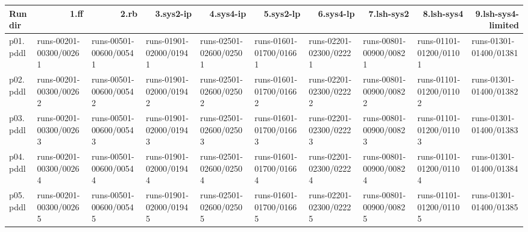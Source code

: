 \documentclass{article}
\begin{document}
\begin{tabular}{@{}lrrrrrrrrr@{}}
Run dir & 1.ff & 2.rb & 3.sys2-ip & 4.sys4-ip & 5.sys2-lp & 6.sys4-lp & 7.lsh-sys2 & 8.lsh-sys4 & 9.lsh-sys4-limited \\
\midrule
p01.pddl & \multicolumn{1}{|l|}{runs-00201-00300/00261} & \multicolumn{1}{|l|}{runs-00501-00600/00541} & \multicolumn{1}{|l|}{runs-01901-02000/01941} & \multicolumn{1}{|l|}{runs-02501-02600/02501} & \multicolumn{1}{|l|}{runs-01601-01700/01661} & \multicolumn{1}{|l|}{runs-02201-02300/02221} & \multicolumn{1}{|l|}{runs-00801-00900/00821} & \multicolumn{1}{|l|}{runs-01101-01200/01101} & \multicolumn{1}{|l|}{runs-01301-01400/01381} \\
p02.pddl & \multicolumn{1}{|l|}{runs-00201-00300/00262} & \multicolumn{1}{|l|}{runs-00501-00600/00542} & \multicolumn{1}{|l|}{runs-01901-02000/01942} & \multicolumn{1}{|l|}{runs-02501-02600/02502} & \multicolumn{1}{|l|}{runs-01601-01700/01662} & \multicolumn{1}{|l|}{runs-02201-02300/02222} & \multicolumn{1}{|l|}{runs-00801-00900/00822} & \multicolumn{1}{|l|}{runs-01101-01200/01102} & \multicolumn{1}{|l|}{runs-01301-01400/01382} \\
p03.pddl & \multicolumn{1}{|l|}{runs-00201-00300/00263} & \multicolumn{1}{|l|}{runs-00501-00600/00543} & \multicolumn{1}{|l|}{runs-01901-02000/01943} & \multicolumn{1}{|l|}{runs-02501-02600/02503} & \multicolumn{1}{|l|}{runs-01601-01700/01663} & \multicolumn{1}{|l|}{runs-02201-02300/02223} & \multicolumn{1}{|l|}{runs-00801-00900/00823} & \multicolumn{1}{|l|}{runs-01101-01200/01103} & \multicolumn{1}{|l|}{runs-01301-01400/01383} \\
p04.pddl & \multicolumn{1}{|l|}{runs-00201-00300/00264} & \multicolumn{1}{|l|}{runs-00501-00600/00544} & \multicolumn{1}{|l|}{runs-01901-02000/01944} & \multicolumn{1}{|l|}{runs-02501-02600/02504} & \multicolumn{1}{|l|}{runs-01601-01700/01664} & \multicolumn{1}{|l|}{runs-02201-02300/02224} & \multicolumn{1}{|l|}{runs-00801-00900/00824} & \multicolumn{1}{|l|}{runs-01101-01200/01104} & \multicolumn{1}{|l|}{runs-01301-01400/01384} \\
p05.pddl & \multicolumn{1}{|l|}{runs-00201-00300/00265} & \multicolumn{1}{|l|}{runs-00501-00600/00545} & \multicolumn{1}{|l|}{runs-01901-02000/01945} & \multicolumn{1}{|l|}{runs-02501-02600/02505} & \multicolumn{1}{|l|}{runs-01601-01700/01665} & \multicolumn{1}{|l|}{runs-02201-02300/02225} & \multicolumn{1}{|l|}{runs-00801-00900/00825} & \multicolumn{1}{|l|}{runs-01101-01200/01105} & \multicolumn{1}{|l|}{runs-01301-01400/01385} \\

\end{tabular}
\end{document}
